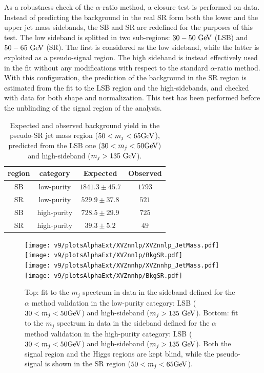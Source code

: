 \vspace*{1\baselineskip}

\noindent As a robustness check of the $\alpha$-ratio method, a closure test is performed on data. Instead of predicting the background in the real SR form both the lower and the upper jet mass sidebands, the SB and SR are redefined for the purposes of this test. The low sideband is splitted in two sub-regions: $30-50~\text{GeV}$ (LSB) and $50-65~\text{GeV}$ (SR). The first is considered as the low sideband, while the latter is exploited as a pseudo-signal region. The high sideband is instead effectively used in the fit without any modifications with respect to the standard $\alpha$-ratio method. With this configuration, the prediction of the background in the SR region is estimated from the fit to the LSB region and the high-sidebands, and checked with data for both shape and normalization. This test has been performed before the unblinding of the signal region of the analysis.

\begin{table}[!htb]
  \begin{center}
    \begin{tabular}{cc|cc}
      region & category & Expected & Observed \\
      \hline
      \hline
      SB & low-purity & $1841.3 \pm 45.7$ & $1793$ \\
      SR & low-purity & $529.9 \pm 37.8$ & $521$ \\
      \hline
      SB & high-purity & $728.5 \pm 29.9$ & $725$ \\
      SR & high-purity & $39.3 \pm 5.2$ & $49$ \\
    \end{tabular}
  \end{center}
  \caption{Expected and observed background yield in the pseudo-SR jet mass region ($ 50 < m_j < 65\text{GeV}$), predicted from the LSB one ($30 < m_j < 50\text{GeV}$) and high-sideband ($m_j > 135~\text{GeV}$).}\label{tab:alphaClosure}
\end{table}

\begin{figure}[!htb]
  \centering
    \texttt{[image: v9/plotsAlphaExt/XVZnnlp/XVZnnlp\_JetMass.pdf]}
    \texttt{[image: v9/plotsAlphaExt/XVZnnlp/BkgSR.pdf]}%
    \\
    \texttt{[image: v9/plotsAlphaExt/XVZnnhp/XVZnnhp\_JetMass.pdf]}
    \texttt{[image: v9/plotsAlphaExt/XVZnnhp/BkgSR.pdf]}%
  \caption{Top: fit to the $m_j$ spectrum in data in the sideband defined for the $\alpha$ method validation in the low-purity category: LSB ($30 < m_j < 50\text{GeV}$) and high-sideband ($m_j > 135~\text{GeV}$). Bottom: fit to the $m_j$ spectrum in data in the sideband defined for the $\alpha$ method validation in the high-purity category: LSB ($30 < m_j < 50\text{GeV}$) and high-sideband ($m_j > 135~\text{GeV}$). Both the signal region and the Higgs regions are kept blind, while the pseudo-signal is shown in the SR region ($50 < m_j < 65\text{GeV}$).}
  \label{fig:alphaClosure}
\end{figure}

